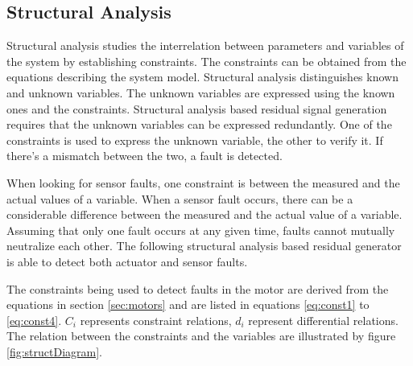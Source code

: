 \subsection{Structural Analysis}

\label{sec:structural}

Structural analysis studies the interrelation between parameters and variables of the system by establishing constraints. The constraints can be obtained from the equations describing the system model. Structural analysis distinguishes known and unknown variables. The unknown variables are expressed using the known ones and the constraints. Structural analysis based residual signal generation requires that the unknown variables can be expressed redundantly. One of the constraints is used to express the unknown variable, the other to verify it. If there's a mismatch between the two, a fault is detected.

When looking for sensor faults, one constraint is between the measured and the actual values of a variable. When a sensor fault occurs, there can be a considerable difference between the measured and the actual value of a variable. Assuming that only one fault occurs at any given time, faults cannot mutually neutralize each other. The following structural analysis based residual generator is able to detect both actuator and sensor faults.

The constraints being used to detect faults in the motor are derived from the equations in section \ref{sec:motors} and are listed in equations \ref{eq:const1} to \ref{eq:const4}. $C_i$ represents constraint relations, $d_i$ represent differential relations. The relation between the constraints and the variables are illustrated by figure \ref{fig:structDiagram}.



%

%

